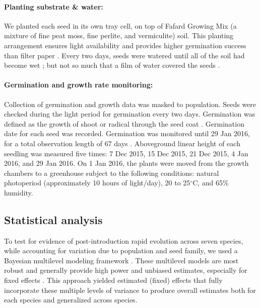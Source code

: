 \documentclass[11pt]{article}\usepackage[]{graphicx}\usepackage[]{color}
\begin{document}
	\paragraph{Planting substrate \& water:} We planted each seed in its own tray cell, on top of Fafard Growing Mix (a mixture of fine peat moss, fine perlite, and vermiculite) soil. This planting arrangement ensures light availability \parencite{Tester1987} and provides higher germination success than filter paper \parencite{Andrews1974}. Every two days, seeds were watered until all of the soil had become wet \parencite{Steinbauer1957}; but not so much that a film of water covered the seeds \parencite{AOSA1960}.
	
	\paragraph{Germination and growth rate monitoring:}  Collection of germination and growth data was masked to population. Seeds were checked during the light period for germination every two days. Germination was defined as the growth of shoot or radical through the seed coat \parencite{Baskin1998,Popay1970}. Germination date for each seed was recorded.  Germination was monitored until 29 Jan 2016, for a total observation length of 67 days  \parencite[this is longer than the typical two-week germination trials according to][]{Baskin1998,Wulff1994}. Aboveground linear height of each seedling was measured five times: 7 Dec 2015, 15 Dec 2015, 21 Dec 2015, 4 Jan 2016, and 29 Jan 2016. On 1 Jan 2016, the plants were moved from the growth chambers to a greenhouse subject to the following conditions: natural photoperiod (approximately 10 hours of light/day), 20 to 25$^\circ$C, and 65\% humidity.
	\subsection{Statistical analysis} 
	To test for evidence of post-introduction rapid evolution across seven species, while accounting for variation due to population and seed family, we used a Bayesian multilevel modeling framework \parencite{Carpenter2017}. These multilevel models are most
robust and generally provide high power and unbiased estimates, especially for fixed effects \parencite{Paccagnella2011}. This approach yielded estimated (fixed) effects that fully incorporate these multiple levels of variance to produce overall estimates both for each species and generalized across species. 
\end{document}
